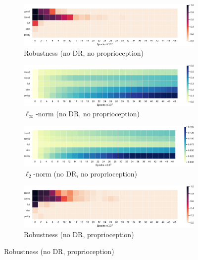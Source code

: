 \begin{figure}
  \centering
  \begin{subfigure}{0.32\textwidth}
    \includegraphics[width=\textwidth]{figures/chapter6/robustness/fetch/visual_std/error}
    \caption{Robustness (no DR, no proprioception)}
  \end{subfigure}
  \begin{subfigure}{0.32\textwidth}
    \includegraphics[width=\textwidth]{figures/chapter6/robustness/fetch/visual_std/inf_dist}
    \caption{$\ell_\infty$-norm (no DR, no proprioception)}
  \end{subfigure}
  \begin{subfigure}{0.32\textwidth}
    \includegraphics[width=\textwidth]{figures/chapter6/robustness/fetch/visual_std/l2_dist}
    \caption{$\ell_2$-norm (no DR, no proprioception)}
  \end{subfigure}
  \begin{subfigure}{0.32\textwidth}
    \includegraphics[width=\textwidth]{figures/chapter6/robustness/fetch/sensor_std/error}
    \caption{Robustness (no DR, proprioception)}
  \end{subfigure}

\end{figure}
